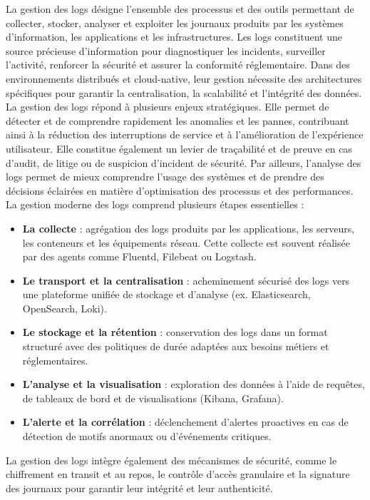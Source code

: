 La gestion des logs désigne l’ensemble des processus et des outils permettant de collecter, stocker, analyser et exploiter les journaux produits par les systèmes d’information, les applications et les infrastructures. Les logs constituent une source précieuse d’information pour diagnostiquer les incidents, surveiller l’activité, renforcer la sécurité et assurer la conformité réglementaire. Dans des environnements distribués et cloud-native, leur gestion nécessite des architectures spécifiques pour garantir la centralisation, la scalabilité et l’intégrité des données.
La gestion des logs répond à plusieurs enjeux stratégiques. Elle permet de détecter et de comprendre rapidement les anomalies et les pannes, contribuant ainsi à la réduction des interruptions de service et à l’amélioration de l’expérience utilisateur. Elle constitue également un levier de traçabilité et de preuve en cas d’audit, de litige ou de suspicion d’incident de sécurité. Par ailleurs, l’analyse des logs permet de mieux comprendre l’usage des systèmes et de prendre des décisions éclairées en matière d’optimisation des processus et des performances.
La gestion moderne des logs comprend plusieurs étapes essentielles :
\begin{itemize}
	\item \textbf{La collecte}  : agrégation des logs produits par les applications, les serveurs, les conteneurs et les équipements réseau. Cette collecte est souvent réalisée par des agents comme Fluentd, Filebeat ou Logstash.
	\item \textbf{Le transport et la centralisation}  : acheminement sécurisé des logs vers une plateforme unifiée de stockage et d’analyse (ex. Elasticsearch, OpenSearch, Loki).
	\item \textbf{Le stockage et la rétention}  : conservation des logs dans un format structuré avec des politiques de durée adaptées aux besoins métiers et réglementaires.
	\item \textbf{L’analyse et la visualisation}  : exploration des données à l’aide de requêtes, de tableaux de bord et de visualisations (Kibana, Grafana).
	\item \textbf{L’alerte et la corrélation}  : déclenchement d’alertes proactives en cas de détection de motifs anormaux ou d’événements critiques.
\end{itemize}

La gestion des logs intègre également des mécanismes de sécurité, comme le chiffrement en transit et au repos, le contrôle d’accès granulaire et la signature des journaux pour garantir leur intégrité et leur authenticité.

